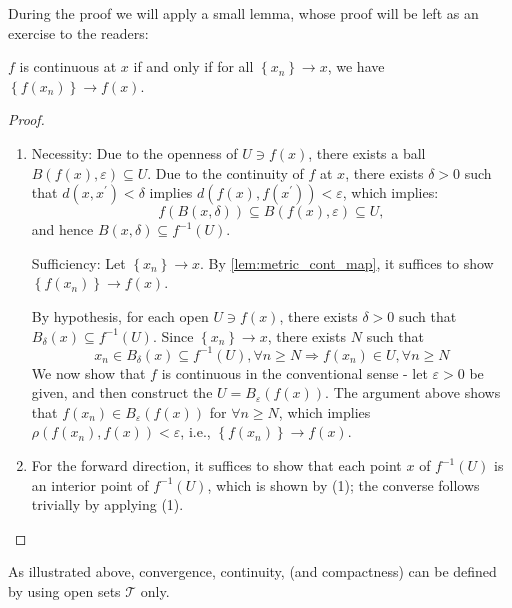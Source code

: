 During the proof we will apply a small lemma, whose proof will be left as an exercise to the readers:
\begin{lemma} \label{lem:metric_cont_map} \(f\) is continuous at \(x\) if and only if for all \(\left\{  {x}_{n}\right\}   \rightarrow  x\), we have \(\left\{  {f\left( {x}_{n}\right) }\right\}   \rightarrow  f\left( x\right)\).
\end{lemma}

\begin{proof} \begin{enumerate}
    \item Necessity: Due to the openness of \(U \ni  f\left( x\right)\), there exists a ball \(B\left( {f\left( x\right),\varepsilon }\right)  \subseteq  U\). Due to the continuity of \(f\) at \(x\), there exists \(\delta  > 0\) such that \(d\left( {x,{x}^{\prime }}\right)  < \delta\) implies \(d\left( {f\left( x\right),f\left( {x}^{\prime }\right) }\right)  < \varepsilon\), which implies:
\[
f\left( {B\left( {x,\delta }\right) }\right)  \subseteq  B\left( {f\left( x\right),\varepsilon }\right)  \subseteq  U,
\]
and hence \(B\left( {x,\delta }\right)  \subseteq  {f}^{-1}\left( U\right)\).

Sufficiency: Let \(\left\{  {x}_{n}\right\} \rightarrow  x\). By \autoref{lem:metric_cont_map}, it suffices to show \(\left\{  {f\left( {x}_{n}\right) }\right\}   \rightarrow  f\left( x\right)\). 

By hypothesis, for each open \(U \ni  f\left( x\right)\), there exists \(\delta  > 0\) such that \({B}_{\delta }\left( x\right)  \subseteq  {f}^{-1}\left( U\right)\). Since \(\left\{  {x}_{n}\right\}   \rightarrow  x\), there exists \(N\) such that
\[
{x}_{n} \in  {B}_{\delta }\left( x\right)  \subseteq  {f}^{-1}\left( U\right),\forall n \geq  N \Rightarrow  f\left( {x}_{n}\right)  \in  U,\forall n \geq  N
\]
We now show that $f$ is continuous in the conventional sense - let \(\varepsilon  > 0\) be given, and then construct the \(U = {B}_{\varepsilon }\left( {f\left( x\right) }\right)\). The argument above shows that \(f\left( {x}_{n}\right)  \in  {B}_{\varepsilon }\left( {f\left( x\right) }\right)\) for \(\forall n \geq  N\), which implies \(\rho \left( {f\left( {x}_{n}\right),f\left( x\right) }\right)  < \varepsilon\), i.e., \(\left\{  {f\left( {x}_{n}\right) }\right\}   \rightarrow  f\left( x\right)\).

\item For the forward direction, it suffices to show that each point \(x\) of \({f}^{-1}\left( U\right)\) is an interior point of \({f}^{-1}\left( U\right)\), which is shown by (1); the converse follows trivially by applying (1).
\end{enumerate}
\end{proof}


As illustrated above, convergence, continuity, (and compactness) can be defined by using open sets \(\mathcal{T}\) only.